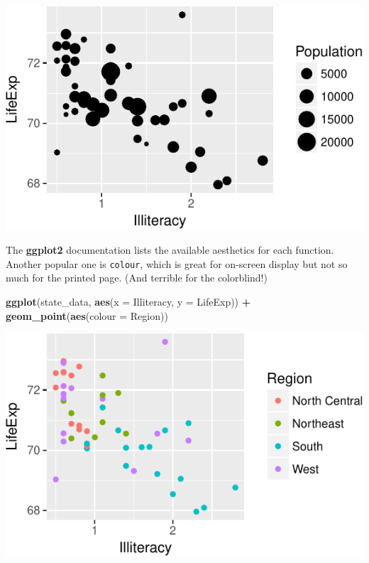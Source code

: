 \documentclass[
  12pt,
  oneside,openany]{book}
\newenvironment{Shaded}{\begin{snugshade}}{\end{snugshade}}
\newcommand{\DataTypeTok}[1]{\textcolor[rgb]{0.13,0.29,0.53}{#1}}
\newcommand{\KeywordTok}[1]{\textcolor[rgb]{0.13,0.29,0.53}{\textbf{#1}}}
\newcommand{\NormalTok}[1]{#1}
\newcommand{\OperatorTok}[1]{\textcolor[rgb]{0.81,0.36,0.00}{\textbf{#1}}}
\newcommand{\StringTok}[1]{\textcolor[rgb]{0.31,0.60,0.02}{#1}}
\begin{document}
\includegraphics{pdaps_files/figure-latex/aes-size-1.pdf}

The \textbf{ggplot2} documentation lists the available aesthetics for each function. Another popular one is \texttt{colour}, which is great for on-screen display but not so much for the printed page. (And terrible for the colorblind!)

\begin{Shaded}
\begin{Highlighting}[]
\KeywordTok{ggplot}\NormalTok{(state\_data, }\KeywordTok{aes}\NormalTok{(}\DataTypeTok{x =}\NormalTok{ Illiteracy, }\DataTypeTok{y =}\NormalTok{ LifeExp)) }\OperatorTok{+}
\StringTok{  }\KeywordTok{geom\_point}\NormalTok{(}\KeywordTok{aes}\NormalTok{(}\DataTypeTok{colour =}\NormalTok{ Region))}
\end{Highlighting}
\end{Shaded}

\includegraphics{pdaps_files/figure-latex/aes-colour-1.pdf}
\end{document}
